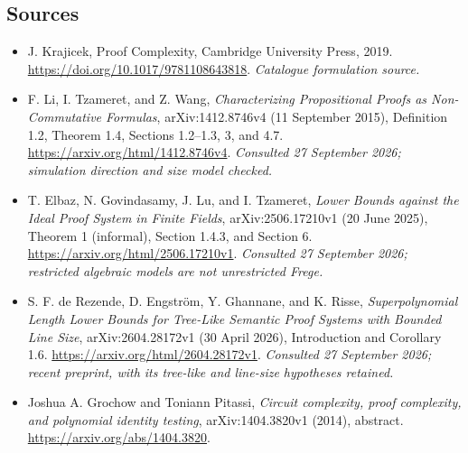 \documentclass[11pt,a4paper]{article}
\numberwithin{equation}{section}
\begin{document}
\subsection{Sources}
\begin{itemize}\raggedright
\item[\textnormal{[S1]}]\hypertarget{source:104:1}{} J. Krajicek, Proof Complexity, Cambridge University Press, 2019.
\url{https://doi.org/10.1017/9781108643818}.
{\small\textit{Catalogue formulation source.}}
\item[\textnormal{[E1]}]\hypertarget{extra:104:1}{} F. Li, I. Tzameret, and Z. Wang,
\emph{Characterizing Propositional Proofs as Non-Commutative Formulas},
arXiv:1412.8746v4 (11 September 2015), Definition 1.2, Theorem 1.4,
Sections 1.2--1.3, 3, and 4.7.
\url{https://arxiv.org/html/1412.8746v4}.
{\small\textit{Consulted 27 September 2026; simulation direction and size model checked.}}
\item[\textnormal{[E2]}]\hypertarget{extra:104:2}{} T. Elbaz, N. Govindasamy,
J. Lu, and I. Tzameret, \emph{Lower Bounds against the Ideal Proof System in
Finite Fields}, arXiv:2506.17210v1 (20 June 2025), Theorem 1 (informal),
Section 1.4.3, and Section 6.
\url{https://arxiv.org/html/2506.17210v1}.
{\small\textit{Consulted 27 September 2026; restricted algebraic models are not unrestricted Frege.}}
\item[\textnormal{[E3]}]\hypertarget{extra:104:3}{} S. F. de Rezende,
D. Engstr\"om, Y. Ghannane, and K. Risse,
\emph{Superpolynomial Length Lower Bounds for Tree-Like Semantic Proof
Systems with Bounded Line Size}, arXiv:2604.28172v1 (30 April 2026),
Introduction and Corollary 1.6.
\url{https://arxiv.org/html/2604.28172v1}.
{\small\textit{Consulted 27 September 2026; recent preprint, with its tree-like and line-size hypotheses retained.}}

\item[\textnormal{[E4]}]\hypertarget{extra:104:4}{} Joshua A. Grochow and
Toniann Pitassi, \emph{Circuit complexity, proof complexity, and polynomial
identity testing}, arXiv:1404.3820v1 (2014), abstract.
\url{https://arxiv.org/abs/1404.3820}.
\end{itemize}
\end{document}
